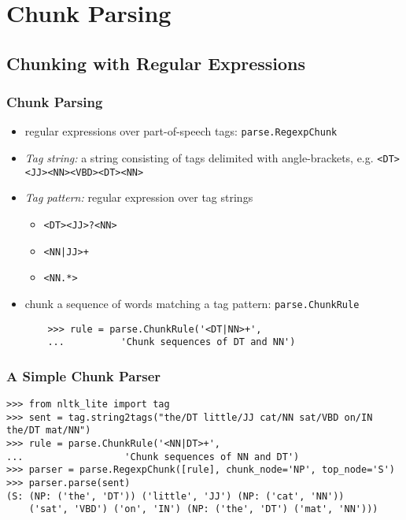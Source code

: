 \documentclass{beamer}             %
\begin{document}
\section{Chunk Parsing}

\subsection{Chunking with Regular Expressions}

\begin{frame}[fragile]
  \frametitle{Chunk Parsing}
  \small

  \begin{itemize}
  \item regular expressions over part-of-speech tags: \texttt{parse.RegexpChunk}
  \item \textit{Tag string:} a string consisting of tags
    delimited with angle-brackets,
    e.g. \verb/<DT><JJ><NN><VBD><DT><NN>/
  \item \textit{Tag pattern:} regular expression over tag strings
    \begin{itemize}
    \item \verb/<DT><JJ>?<NN>/
    \item \verb/<NN|JJ>+/
    \item \verb/<NN.*>/
    \end{itemize}
  \item chunk a sequence of words matching a tag pattern: \texttt{parse.ChunkRule}

\begin{verbatim}
    >>> rule = parse.ChunkRule('<DT|NN>+',
    ...          'Chunk sequences of DT and NN')
\end{verbatim}

  \end{itemize}
\end{frame}


\begin{frame}[fragile]
  \frametitle{A Simple Chunk Parser}
  \scriptsize

\begin{verbatim}
>>> from nltk_lite import tag
>>> sent = tag.string2tags("the/DT little/JJ cat/NN sat/VBD on/IN the/DT mat/NN")
>>> rule = parse.ChunkRule('<NN|DT>+',
...                  'Chunk sequences of NN and DT')
>>> parser = parse.RegexpChunk([rule], chunk_node='NP', top_node='S')
>>> parser.parse(sent)
(S: (NP: ('the', 'DT')) ('little', 'JJ') (NP: ('cat', 'NN'))
    ('sat', 'VBD') ('on', 'IN') (NP: ('the', 'DT') ('mat', 'NN')))
\end{verbatim}
\end{frame}
\end{document}
